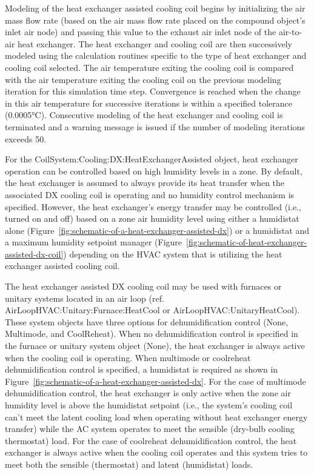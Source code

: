 Modeling of the heat exchanger assisted cooling coil begins by initializing the air mass flow rate (based on the air mass flow rate placed on the compound object's inlet air node) and passing this value to the exhaust air inlet node of the air-to-air heat exchanger. The heat exchanger and cooling coil are then successively modeled using the calculation routines specific to the type of heat exchanger and cooling coil selected. The air temperature exiting the cooling coil is compared with the air temperature exiting the cooling coil on the previous modeling iteration for this simulation time step. Convergence is reached when the change in this air temperature for successive iterations is within a specified tolerance (0.0005°C). Consecutive modeling of the heat exchanger and cooling coil is terminated and a warning message is issued if the number of modeling iterations exceeds 50.

For the CoilSystem:Cooling:DX:HeatExchangerAssisted object, heat exchanger operation can be controlled based on high humidity levels in a zone. By default, the heat exchanger is assumed to always provide its heat transfer when the associated DX cooling coil is operating and no humidity control mechanism is specified. However, the heat exchanger's energy transfer may be controlled (i.e., turned on and off) based on a zone air humidity level using either a humidistat alone (Figure~\ref{fig:schematic-of-a-heat-exchanger-assisted-dx}) or a humidistat and a maximum humidity setpoint manager (Figure~\ref{fig:schematic-of-heat-exchanger-assisted-dx-coil}) depending on the HVAC system that is utilizing the heat exchanger assisted cooling coil.

The heat exchanger assisted DX cooling coil may be used with furnaces or unitary systems located in an air loop (ref. AirLoopHVAC:Unitary:Furnace:HeatCool or AirLoopHVAC:UnitaryHeatCool). These system objects have three options for dehumidification control (None, Multimode, and CoolReheat). When no dehumidification control is specified in the furnace or unitary system object (None), the heat exchanger is always active when the cooling coil is operating. When multimode or coolreheat dehumidification control is specified, a humidistat is required as shown in Figure~\ref{fig:schematic-of-a-heat-exchanger-assisted-dx}. For the case of multimode dehumidification control, the heat exchanger is only active when the zone air humidity level is above the humidistat setpoint (i.e., the system's cooling coil can't meet the latent cooling load when operating without heat exchanger energy transfer) while the AC system operates to meet the sensible (dry-bulb cooling thermostat) load. For the case of coolreheat dehumidification control, the heat exchanger is always active when the cooling coil operates and this system tries to meet both the sensible (thermostat) and latent (humidistat) loads.

